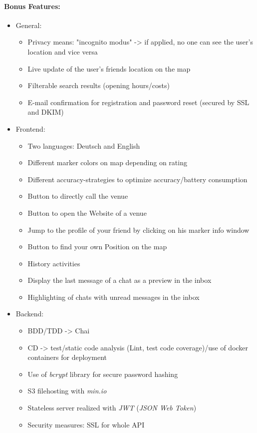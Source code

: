 \paragraph{Bonus Features:}
\begin{itemize}
	\item General:
	\begin{itemize}
		\item Privacy means: "incognito modus" -> if applied, no one can see the user's location and vice versa
		\item Live update of the user's friends location on the map
		\item Filterable search results (opening hours/costs)
		\item E-mail confirmation for registration and password reset (secured by SSL and DKIM)
	\end{itemize}
	\item Frontend:
	\begin{itemize}
		\item Two languages: Deutsch and English
		\item Different marker colors on map depending on rating
		\item Different accuracy-strategies to optimize accuracy/battery consumption
		\item Button to directly call the venue
		\item Button to open the Website of a venue
		\item Jump to the profile of your friend by clicking on his marker info window
		\item Button to find your own Position on the map
		\item History activities
		\item Display the last message of a chat as a preview in the inbox
		\item 	Highlighting of chats with unread messages in the inbox
	\end{itemize}
	\item Backend:
	\begin{itemize}
		\item BDD/TDD -> Chai
		\item CD -> test/static code analysis (Lint, test code coverage)/use of docker containers for deployment
		\item Use of \textit{bcrypt} library for secure password hashing
		\item S3 filehosting with \textit{min.io}
		\item Stateless server realized with \textit{JWT} (\textit{JSON Web Token})
		\item Security measures: SSL for whole API
	\end{itemize}
\end{itemize}

